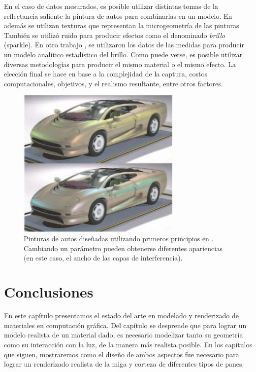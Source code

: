 En el caso de datos mesurados, es posible utilizar distintas tomas de la reflectancia saliente la pintura de autos para combinarlas en un modelo.
En \cite{Dumont2001} además se utilizan texturas que representan la microgeometría de las pinturas También se utilizó ruido para producir efectos como el denominado {\em brillo} (sparkle).
En otro trabajo \cite{Gunther2005}, se utilizaron los datos de las medidas para producir un modelo analítico estadístico del brillo.
Como puede verse, es posible utilizar diversas metodologías para producir el mismo material o el mismo efecto.
La elección final se hace en base a la complejidad de la captura, costos computacionales, objetivos, y el realismo resultante, entre otros factores.

\begin{figure}
\center
\includegraphics[width=8cm]{figures/pinturaauto}
\caption[Pinturas de autos diseñadas utilizando primeros principios]{Pinturas de autos diseñadas utilizando primeros principios en \cite{Ershov2001}. Cambiando un parámetro pueden obtenerse diferentes apariencias (en este caso, el ancho de las capas de interferencia).}
\label{fg:pinturaauto}
\end{figure}


\section{Conclusiones}
En este capítulo presentamos el estado del arte en modelado y renderizado de materiales en computación gráfica.
Del capítulo se desprende que para lograr un modelo realista de un material dado, es necesario modelizar tanto su geometría como su interacción con la luz, de la manera más realista posible.
En los capítulos que siguen, mostraremos como el diseño de ambos aspectos fue necesario para lograr un renderizado realista de la miga y corteza de diferentes tipos de panes.

